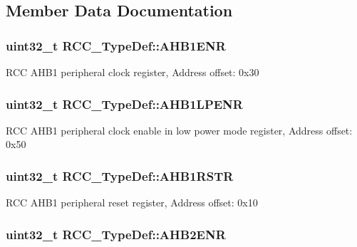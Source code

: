 \subsection{Member Data Documentation}
\hypertarget{struct_r_c_c___type_def_af58a7ad868f07f8759eac3e31b6fa79e}{
\subsubsection[{A\-H\-B1\-E\-N\-R}]{ uint32\-\_\-t R\-C\-C\-\_\-\-Type\-Def\-::\-A\-H\-B1\-E\-N\-R}}\label{struct_r_c_c___type_def_af58a7ad868f07f8759eac3e31b6fa79e}
R\-C\-C A\-H\-B1 peripheral clock register, Address offset\-: 0x30 \hypertarget{struct_r_c_c___type_def_a89d6c21f02196b7f59bcc30c1061dd87}{
\subsubsection[{A\-H\-B1\-L\-P\-E\-N\-R}]{ uint32\-\_\-t R\-C\-C\-\_\-\-Type\-Def\-::\-A\-H\-B1\-L\-P\-E\-N\-R}}\label{struct_r_c_c___type_def_a89d6c21f02196b7f59bcc30c1061dd87}
R\-C\-C A\-H\-B1 peripheral clock enable in low power mode register, Address offset\-: 0x50 \hypertarget{struct_r_c_c___type_def_ad6abf71a348744aa3f2b7e8b214c1ca4}{
\subsubsection[{A\-H\-B1\-R\-S\-T\-R}]{ uint32\-\_\-t R\-C\-C\-\_\-\-Type\-Def\-::\-A\-H\-B1\-R\-S\-T\-R}}\label{struct_r_c_c___type_def_ad6abf71a348744aa3f2b7e8b214c1ca4}
R\-C\-C A\-H\-B1 peripheral reset register, Address offset\-: 0x10 \hypertarget{struct_r_c_c___type_def_af326cb98c318fc08894a8dd79c2c675f}{
\subsubsection[{A\-H\-B2\-E\-N\-R}]{ uint32\-\_\-t R\-C\-C\-\_\-\-Type\-Def\-::\-A\-H\-B2\-E\-N\-R}}\label{struct_r_c_c___type_def_af326cb98c318fc08894a8dd79c2c675f}
